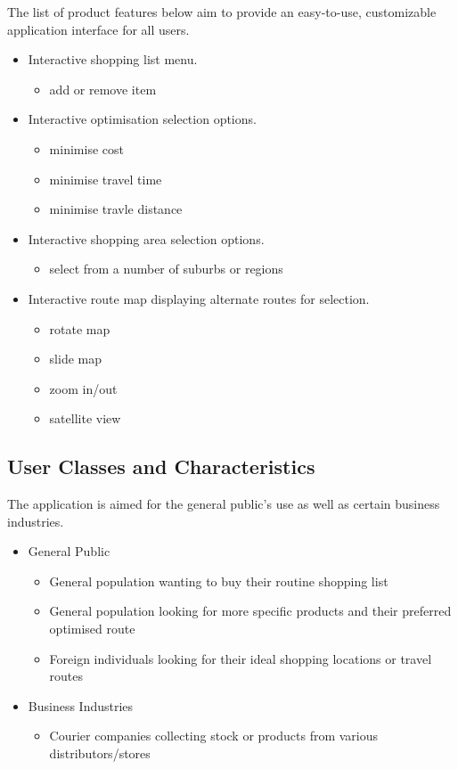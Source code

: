 \documentclass[10pt, a4paper, onecolumn]{scrartcl}
\begin{document}
			The list of product features below aim to provide an easy-to-use, customizable application interface for all users. 
		
			\begin{itemize}
				\item Interactive shopping list menu.
				\begin{itemize}
					\item add or remove item
				\end{itemize}
				\item Interactive optimisation selection options.
				\begin{itemize}
					\item minimise cost
					\item minimise travel time
					\item minimise travle distance
				\end{itemize}
				\item Interactive shopping area selection options.
				\begin{itemize}
					\item select from a number of suburbs or regions
				\end{itemize}
				\item Interactive route map displaying alternate routes for selection.
				\begin{itemize}
					\item rotate map
					\item slide map
					\item zoom in/out
					\item satellite view
				\end{itemize}
			\end{itemize}
		
		\subsection{User Classes and Characteristics}
		
			The application is aimed for the general public's use as well as certain business industries. 
			
			\begin{itemize}
				\item General Public
				\begin{itemize}
					\item General population wanting to buy their routine shopping list
					\item General population looking for more specific products and their preferred optimised route
					\item Foreign individuals looking for their ideal shopping locations or travel routes
				\end{itemize}
				\item Business Industries
				\begin{itemize}
					\item Courier companies collecting stock or products from various distributors/stores
				\end{itemize}
			\end{itemize}
		
\end{document}
